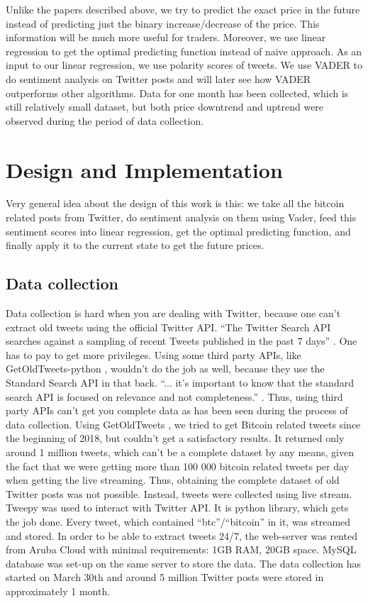 \documentclass[a4paper,11pt,oneside]{article}
\begin{document}
  
  Unlike the papers described above, we try to predict the exact price in the future instead of predicting just the binary increase/decrease of the price. This information will be much more useful for traders. Moreover, we use linear regression to get the optimal predicting function instead of naive approach. As an input to our linear regression, we use polarity scores of tweets. We use VADER to do sentiment analysis on Twitter posts and will later see how VADER outperforms other algorithms. Data for one month has been collected, which is still relatively small dataset, but both price downtrend and uptrend were observed during the period of data collection.

  \section{Design and Implementation}

  Very general idea about the design of this work is this: we take all the bitcoin related posts from Twitter, do sentiment analysis on them using Vader, feed this sentiment scores into linear regression, get the optimal predicting function, and finally apply it to the current state to get the future prices.
  
  \subsection{Data collection}
  
  Data collection is hard when you are dealing with Twitter, because one can’t extract old tweets using the official Twitter API. “The Twitter Search API searches against a sampling of recent Tweets published in the past 7 days” \cite{twitterstandardsearch}. One has to pay to get more privileges. Using some third party APIs, like GetOldTweets-python \cite{getoldtweets}, wouldn’t do the job as well, because they use the Standard Search API in that back. “... it’s important to know that the standard search API is focused on relevance and not completeness.” \cite{twitterstandardsearch}. Thus, using third party APIs can’t get you complete data as has been seen during the process of data collection. Using GetOldTweets \cite{getoldtweets}, we tried to get Bitcoin related tweets since the beginning of 2018, but couldn’t get a satisfactory results. It returned only around 1 million tweets, which can’t be a complete dataset by any means, given the fact that we were getting more than 100 000 bitcoin related tweets per day when getting the live streaming. Thus, obtaining the complete dataset of old Twitter posts was not possible. Instead, tweets were collected using live stream. Tweepy \cite{tweepy} was used to interact with Twitter API. It is python library, which gets the job done. Every tweet, which contained “btc”/“bitcoin” in it, was streamed and stored. In order to be able to extract tweets 24/7, the web-server was rented from Aruba Cloud \cite{arubacloud} with minimal requirements: 1GB RAM, 20GB space. MySQL database was set-up on the same server to store the data. The data collection has started on March 30th and around 5 million Twitter posts were stored in approximately 1 month.
  
\end{document}
